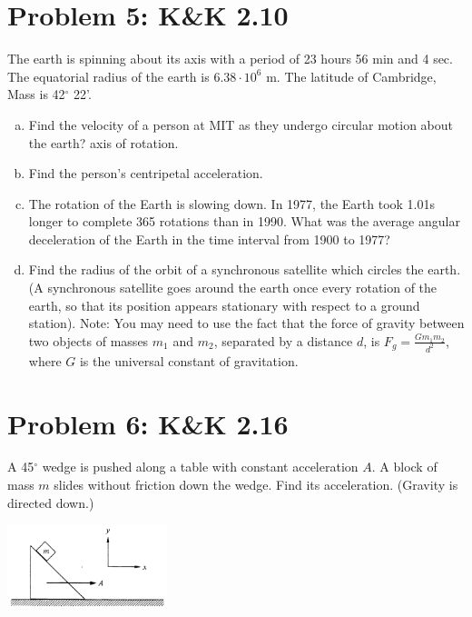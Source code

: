 \documentclass[problems]{esg8012pset}
\begin{document}
\section*{Problem 5: K\&K 2.10}
  The earth is spinning about its axis with a period of 23 hours 56 min and 4 sec. The equatorial radius of the earth is $6.38\cdot 10^{6}$ m. The latitude of Cambridge, Mass is 42$^{\circ}$ 22'.
  \begin{enumerate}[a)]
    \item Find the velocity of a person at MIT as they undergo circular motion about the earth? axis of rotation.
    \item Find the person's centripetal acceleration.
    \item The rotation of the Earth is slowing down. In 1977, the Earth took 1.01s longer to complete 365 rotations than in 1990. What was the average angular deceleration of the Earth in the time interval from 1900 to 1977?
    \item Find the radius of the orbit of a synchronous satellite which circles the earth. (A synchronous satellite goes around the earth once every rotation of the earth, so that its position appears stationary with respect to a ground station).  Note: You may need to use the fact that the force of gravity between two objects of masses $m_1$ and $m_2$, separated by a distance $d$, is $F_g = \frac{G m_1 m_2}{d^2}$, where $G$ is the universal constant of gravitation.
  \end{enumerate}
\section*{Problem 6: K\&K 2.16}
  A 45$^{\circ}$ wedge is pushed along a table with constant acceleration $A$. A block of mass $m$ slides without friction down the wedge. Find its acceleration. (Gravity is directed down.)
  \begin{center}\includegraphics[width=0.35\textwidth]{ps02_4}\end{center}
\end{document}
